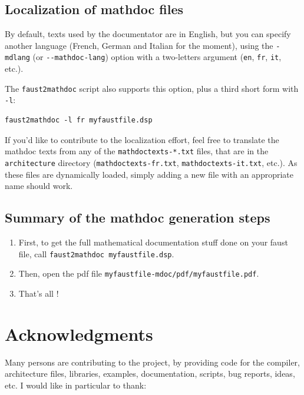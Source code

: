 \documentclass[a4paper,10pt]{book}
\begin{document}
\section{Localization of mathdoc files}
\label{sec:localization-mdoc}

By default, texts used by the documentator are in English, but you can specify another language (French, German and Italian for the moment), using the \lstinline!-mdlang! (or \lstinline!--mathdoc-lang!) option with a two-letters argument (\lstinline!en!, \lstinline!fr!, \lstinline!it!, etc.).

The \lstinline!faust2mathdoc! script also supports this option, plus a third short form with \lstinline!-l!:
\begin{lstlisting}
faust2mathdoc -l fr myfaustfile.dsp
\end{lstlisting}

If you'd like to contribute to the localization effort, feel free to translate the mathdoc texts from any of the \lstinline!mathdoctexts-*.txt! files, that are in the \lstinline!architecture! directory (\lstinline!mathdoctexts-fr.txt!, \lstinline!mathdoctexts-it.txt!, etc.). As these files are dynamically loaded, simply adding a new file with an appropriate name should work.




\section{Summary of the mathdoc generation steps}
\label{sec:mdoc-summary}

\begin{enumerate}
\item First, to get the full mathematical documentation stuff done on your faust file, call \lstinline!faust2mathdoc myfaustfile.dsp!.
\item Then, open the pdf file \lstinline!myfaustfile-mdoc/pdf/myfaustfile.pdf!.
\item That's all !
\end{enumerate}




\chapter{Acknowledgments}
Many persons are contributing to the \faust project, by providing code for the compiler, architecture files, libraries, examples, documentation, scripts, bug reports, ideas, etc. I would like in particular to thank:
\end{document}

